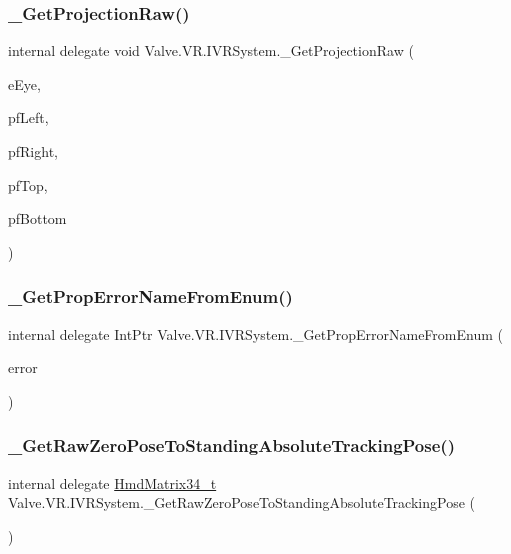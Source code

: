 \subsubsection{\texorpdfstring{\_GetProjectionRaw()}{\_GetProjectionRaw()}}
{\footnotesize\ttfamily internal delegate void Valve.\+V\+R.\+I\+V\+R\+System.\+\_\+\+Get\+Projection\+Raw (\begin{DoxyParamCaption}\item[{\mbox{\hyperlink{namespace_valve_1_1_v_r_a8153d4a3e627e1cede046327087c1880}{E\+V\+R\+Eye}}}]{e\+Eye,  }\item[{ref float}]{pf\+Left,  }\item[{ref float}]{pf\+Right,  }\item[{ref float}]{pf\+Top,  }\item[{ref float}]{pf\+Bottom }\end{DoxyParamCaption})}

\mbox{\label{struct_valve_1_1_v_r_1_1_i_v_r_system_ab8df6803ff20af23449bb3a8951f75f8}} 
\subsubsection{\texorpdfstring{\_GetPropErrorNameFromEnum()}{\_GetPropErrorNameFromEnum()}}
{\footnotesize\ttfamily internal delegate Int\+Ptr Valve.\+V\+R.\+I\+V\+R\+System.\+\_\+\+Get\+Prop\+Error\+Name\+From\+Enum (\begin{DoxyParamCaption}\item[{\mbox{\hyperlink{namespace_valve_1_1_v_r_aab6684f03930a2d2cf22ed66b437e47b}{E\+Tracked\+Property\+Error}}}]{error }\end{DoxyParamCaption})}

\mbox{\label{struct_valve_1_1_v_r_1_1_i_v_r_system_acca513b3beff9bcf5c4e6cc4cb367b64}} 
\subsubsection{\texorpdfstring{\_GetRawZeroPoseToStandingAbsoluteTrackingPose()}{\_GetRawZeroPoseToStandingAbsoluteTrackingPose()}}
{\footnotesize\ttfamily internal delegate \mbox{\hyperlink{struct_valve_1_1_v_r_1_1_hmd_matrix34__t}{Hmd\+Matrix34\+\_\+t}} Valve.\+V\+R.\+I\+V\+R\+System.\+\_\+\+Get\+Raw\+Zero\+Pose\+To\+Standing\+Absolute\+Tracking\+Pose (\begin{DoxyParamCaption}{ }\end{DoxyParamCaption})}

